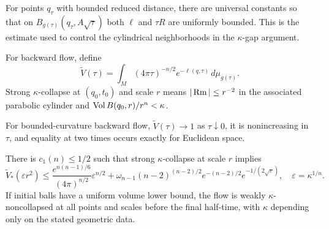 \begin{lemma}
\label{lem:chow-iii-large-neighborhood-estimates}
For points $q_\tau$ with bounded reduced distance, there are universal constants
so that on $B_{g(\tau)}(q_\tau,A\sqrt\tau)$ both $\ell$ and $\tau R$ are
uniformly bounded.  This is the estimate used to control the cylindrical
neighborhoods in the $\kappa$-gap argument.
\end{lemma}

\begin{definition}
\label{def:chow-iii-reduced-volume-strong-collapse}
For backward flow, define
\[
\widetilde V(\tau)=\int_M(4\pi\tau)^{-n/2}e^{-\ell(q,\tau)}\,d\mu_{g(\tau)}.
\]
Strong $\kappa$-collapse at $(q_0,t_0)$ and scale $r$ means
$|\operatorname{Rm}|\le r^{-2}$ in the associated parabolic cylinder and
$\operatorname{Vol} B(q_0,r)/r^n<\kappa$.
\end{definition}

\begin{theorem}
\label{thm:chow-iii-reduced-volume-monotonicity}
For bounded-curvature backward flow, $\widetilde V(\tau)\to1$ as $\tau\downarrow0$,
it is nonincreasing in $\tau$, and equality at two times occurs exactly for
Euclidean space.
\end{theorem}

\begin{theorem}
\label{thm:chow-iii-weakened-no-local-collapsing}
There is $c_1(n)\le1/2$ such that strong $\kappa$-collapse at scale $r$ implies
\[
\widetilde V_*(\varepsilon r^2)\le
\frac{e^{n(n-1)/6}}{(4\pi)^{n/2}}\varepsilon^{n/2}
 +\omega_{n-1}(n-2)^{(n-2)/2}e^{-(n-2)/2}e^{-1/(2\sqrt\varepsilon)},
\quad \varepsilon=\kappa^{1/n}.
\]
If initial balls have a uniform volume lower bound, the flow is weakly
$\kappa$-noncollapsed at all points and scales before the final half-time,
with $\kappa$ depending only on the stated geometric data.
\end{theorem}

